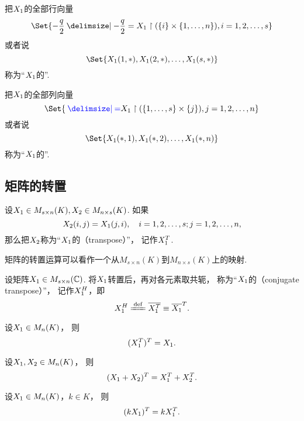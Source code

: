 把\(X_1\)的全部行向量\[
	\Set{ \a \given \a=\A\upharpoonright(\{i\}\times\{1,\dotsc,n\}), i=1,2,\dotsc,s }
\]或者说\[
	\Set{\MatrixEntry\A{1,*},\MatrixEntry\A{2,*},\dotsc,\MatrixEntry\A{s,*}}
\]
称为“\(X_1\)的”.

把\(X_1\)的全部列向量\[
	\Set{ \b \given \b=\A\upharpoonright(\{1,\dotsc,s\}\times\{j\}), j=1,2,\dotsc,n }
\]或者说\[
	\Set{\MatrixEntry\A{*,1},\MatrixEntry\A{*,2},\dotsc,\MatrixEntry\A{*,n}}
\]
称为“\(X_1\)的”.

\subsection{矩阵的转置}
\begin{definition}
设\(X_1\in M_{s \times n}(K),
X_2\in M_{n \times s}(K)\).
如果\[
	X_2(i,j)=X_1(j,i),
	\quad i=1,2,\dotsc,s;j=1,2,\dotsc,n,
\]
那么把\(X_2\)称为“\(X_1\)的（transpose）”，
记作\(X_1^T\).
\end{definition}
矩阵的转置运算可以看作一个从\(M_{s \times n}(K)\)到\(M_{n \times s}(K)\)上的映射.

\begin{definition}
设矩阵\(X_1 \in M_{s \times n}(\mathbb{C})\).
将\(X_1\)转置后，再对各元素取共轭，
称为“\(X_1\)的（conjugate transpose）”，
记作\(X_1^H\)，即\[
    \A^H \defeq \overline{\A^T} \equiv \overline{\A}^T.
\]
\end{definition}

\begin{property}\label{theorem:矩阵的转置.性质1}
设\(X_1 \in M_n(K)\)，
则\begin{equation}
	(X_1^T)^T = X_1.
\end{equation}
\end{property}

\begin{property}\label{theorem:矩阵的转置.性质2}
设\(X_1,X_2 \in M_n(K)\)，
则\begin{equation}
	(X_1+X_2)^T = X_1^T + X_2^T.
\end{equation}
\end{property}

\begin{property}\label{theorem:矩阵的转置.性质3}
设\(X_1 \in M_n(K)\)，\(k \in K\)，
则\begin{equation}
	(k X_1)^T = k X_1^T.
\end{equation}
\end{property}


